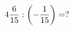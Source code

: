\documentclass[preview]{standalone}
\begin{document}
\begin{align*}
4 { 6 \over 15 }  :  \left( - { 1 \over 15 } \right) =  ?
\end{align*}
\end{document}
